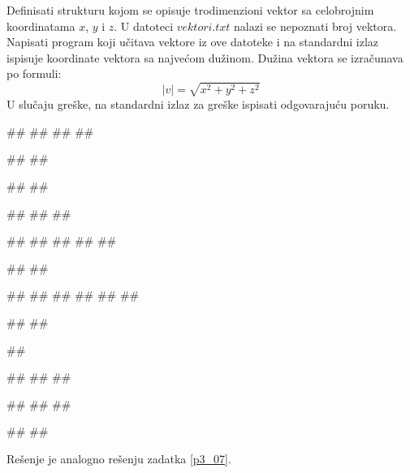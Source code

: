 \begin{Exercise}[label=p3_x5]         
Definisati strukturu kojom se opisuje trodimenzioni vektor sa celobrojnim koordinatama $x$, $y$ i $z$.
U datoteci $vektori.txt$ nalazi se nepoznati broj vektora. 
Napisati program koji učitava vektore iz ove datoteke i na standardni izlaz ispisuje 
koordinate vektora sa najvećom dužinom. 
Dužina vektora se izračunava po formuli:
$$|v|= \sqrt{x^2+y^2+z^2}$$
U slučaju greške, na standardni izlaz za greške ispisati odgovarajuću poruku.

\begin{minitest}
\begin{upotreba}{1}
##
##
##
##

#\naslovIzlaz#
##
\end{upotreba}
\end{minitest}
\begin{minitest}
\begin{upotreba}{2}
##
##

#\naslovIzlazZaGresku#
##
##
\end{upotreba}
\end{minitest}
\begin{minitest}
\begin{upotreba}{3}
##
##
##
##
##

#\naslovIzlaz#
##
\end{upotreba}
\end{minitest}

\begin{minitest}
\begin{upotreba}{4}
##
##
##
##
##
##

#\naslovIzlaz#
##
\end{upotreba}
\end{minitest}
\begin{minitest}
\begin{upotreba}{5}
##

#\naslovIzlazZaGresku#
##
##
\end{upotreba}
\end{minitest}
\begin{minitest}
\begin{upotreba}{6}
##
##
##

#\naslovIzlaz#
##
\end{upotreba}
\end{minitest}
\end{Exercise}
\begin{Answer}[ref=p3_x5]
 
Rešenje je analogno rešenju zadatka \ref{p3_07}.
\end{Answer}


